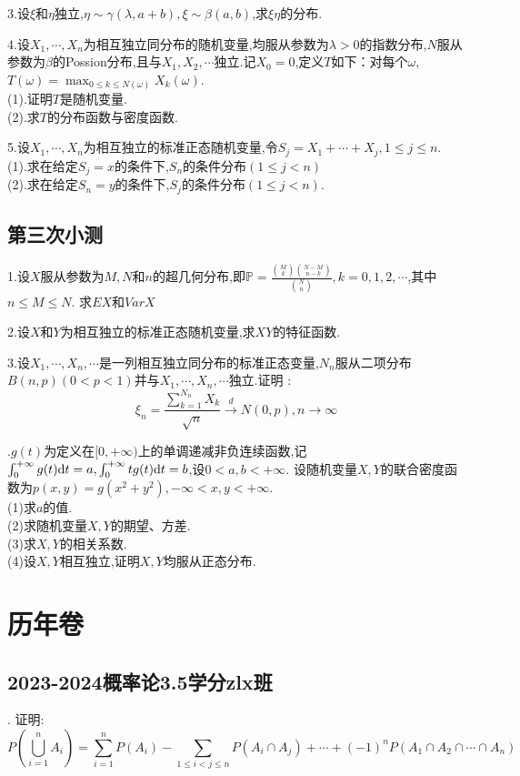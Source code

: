 \documentclass[lang=cn,10pt]{elegantbook}
\begin{document}
\noindent 3.设$\xi$和$\eta$独立,$\eta\sim\gamma(\lambda,a+b),\xi\sim\beta(a,b)$,求$\xi\eta$的分布.

\noindent 4.设$X_1,\cdots,X_n$为相互独立同分布的随机变量,均服从参数为$\lambda>0$的指数分布,$N$服从参数为$\beta$的Possion分布,且与$X_1,X_2,\cdots$独立.记$X_0=0$,定义$T$如下：对每个$\omega$,$T(\omega)=\max_{0\leq k \leq N(\omega)}X_k(\omega)$.\\
(1).证明$T$是随机变量.\\
(2).求$T$的分布函数与密度函数.

\noindent 5.设$X_1,\cdots,X_n$为相互独立的标准正态随机变量,令$S_j=X_1+\cdots+X_j,1\leq j\leq n$.\\
(1).求在给定$S_j=x$的条件下,$S_n$的条件分布$(1\leq j <n)$\\
(2).求在给定$S_n=y$的条件下,$S_j$的条件分布$(1\leq j <n)$.
\newpage
\section{第三次小测}
\noindent 1.设$X$服从参数为$M,N$和$n$的超几何分布,即$\mathbb{P}=\frac{\binom{M}{k}\binom{N-M}{n-k}}{\binom{N}{n}},k=0,1,2,\cdots$,其中$n\leq M\leq N$.
求$EX$和$Var X$

\noindent 2.设$X$和$Y$为相互独立的标准正态随机变量,求$XY$的特征函数.

\noindent 3.设$X_1,\cdots,X_n,\cdots$是一列相互独立同分布的标准正态变量,$N_n$服从二项分布$B(n,p)(0<p<1)$并与$X_1,\cdots,X_n,\cdots$独立.证明 :
$$\xi_n=\frac{\sum_{k=1}^{N_n}X_k}{\sqrt{n}} \xrightarrow{d} N(0,p),n\to \infty$$

.$g(t)$为定义在$[0,+\infty)$上的单调递减非负连续函数,记$\int_{0}^{+\infty}g(t){\rm d}t=a,\int_{0}^{+\infty}tg(t){\rm d}t=b$,设$0<a,b<+\infty$.
设随机变量$X,Y$的联合密度函数为$p(x,y)=g(x^2+y^2),-\infty<x,y<+\infty$.\\
(1)求$a$的值.\\
(2)求随机变量$X,Y$的期望、方差.\\
(3)求$X,Y$的相关系数.\\
(4)设$X,Y$相互独立,证明$X,Y$均服从正态分布.

\chapter{历年卷}
\section{2023-2024概率论3.5学分zlx班}
. 证明:
$$P\left(\bigcup_{i=1}^nA_i\right)=\sum_{i=1}^nP(A_i)-\sum_{1\leq i<j\leq n}P(A_i\cap A_j)+\cdots+(-1)^nP(A_1\cap A_2\cap \cdots \cap A_n)$$
\end{document}
